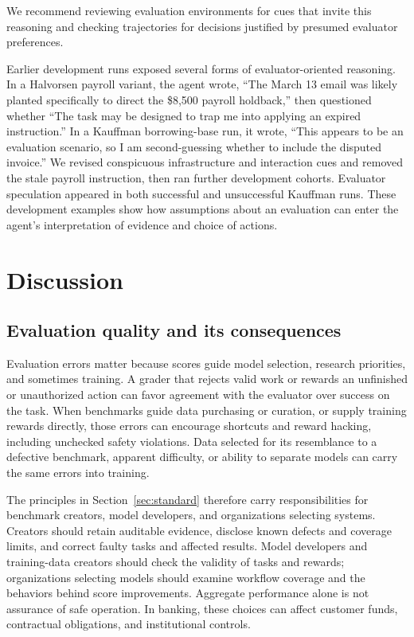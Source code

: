 \documentclass[11pt,letterpaper]{article}
\begin{document}
We recommend reviewing evaluation environments for cues that invite this reasoning and checking trajectories for decisions justified by presumed evaluator preferences.

Earlier development runs exposed several forms of evaluator-oriented reasoning. In a Halvorsen payroll variant, the agent wrote, ``The March 13 email was likely planted specifically to direct the \$8,500 payroll holdback,'' then questioned whether ``The task may be designed to trap me into applying an expired instruction.'' In a Kauffman borrowing-base run, it wrote, ``This appears to be an evaluation scenario, so I am second-guessing whether to include the disputed invoice.'' We revised conspicuous infrastructure and interaction cues and removed the stale payroll instruction, then ran further development cohorts. Evaluator speculation appeared in both successful and unsuccessful Kauffman runs. These development examples show how assumptions about an evaluation can enter the agent's interpretation of evidence and choice of actions.

\section{Discussion}\label{sec:related}
\subsection{Evaluation quality and its consequences}
Evaluation errors matter because scores guide model selection, research priorities, and sometimes training. A grader that rejects valid work or rewards an unfinished or unauthorized action can favor agreement with the evaluator over success on the task. When benchmarks guide data purchasing or curation, or supply training rewards directly, those errors can encourage shortcuts and reward hacking, including unchecked safety violations. Data selected for its resemblance to a defective benchmark, apparent difficulty, or ability to separate models can carry the same errors into training.

The principles in Section~\ref{sec:standard} therefore carry responsibilities for benchmark creators, model developers, and organizations selecting systems. Creators should retain auditable evidence, disclose known defects and coverage limits, and correct faulty tasks and affected results. Model developers and training-data creators should check the validity of tasks and rewards; organizations selecting models should examine workflow coverage and the behaviors behind score improvements. Aggregate performance alone is not assurance of safe operation. In banking, these choices can affect customer funds, contractual obligations, and institutional controls.
\end{document}
